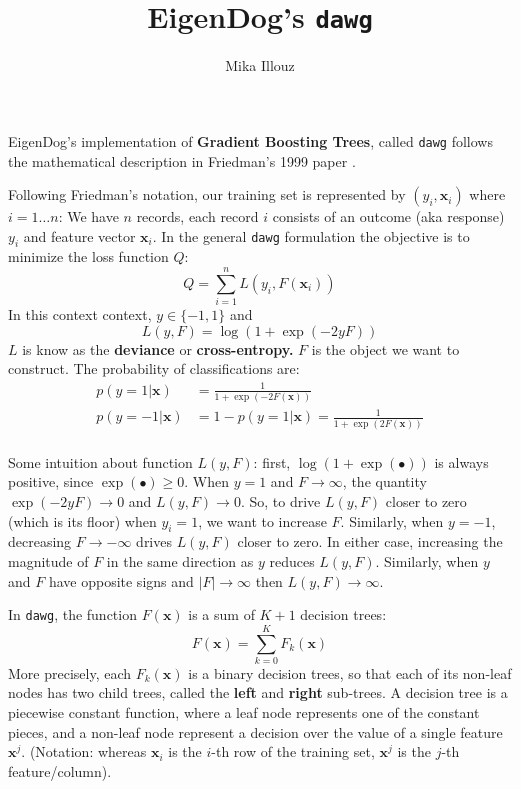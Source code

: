 \documentclass{article}
\author{Mika Illouz}
\title{EigenDog's \texttt{dawg}}
\newcommand{\vx}[0]{\mathbf{x}}
\begin{document}
\maketitle

EigenDog's implementation of {\bf Gradient Boosting Trees}, called
\texttt{dawg} follows the mathematical description in Friedman's 1999
paper \cite{GBM}.

Following Friedman's notation, our training set is represented by
$(y_i, \vx_i)$ where $i = 1 \ldots n$: We have $n$ records, each
record $i$ consists of an outcome (aka response) $y_i$ and feature
vector $\vx_i$.  In the general \texttt{dawg} formulation the objective is to
minimize the loss function $Q$:
%
\begin{equation}
\label{objective}
Q = \sum_{i=1}^{n} L(y_i, F(\vx_i))
\end{equation}
%
In this context context, $y \in \{ -1, 1 \}$ and
%
\[
L(y,F) = \log ( 1 + \exp( -2 y F ) )
\]
$L$ is know as the {\bf deviance} or {\bf cross-entropy.}  $F$ is the
object we want to construct.  The probability of classifications are:
\begin{equation}
\begin{split}
p(y =1|\vx) &= \frac{1}{1 + \exp(-2 F(\vx) )} \\
p(y =-1|\vx) &= 1 - p(y=1|\vx) = \frac{1}{1 + \exp(2 F(\vx) )} \\
\end{split}
\end{equation}

Some intuition about function $L(y,F)$:
first, $\log( 1 + \exp (\bullet) )$ is always positive, since
$\exp(\bullet) \ge 0$.  When $y=1$ and $F \rightarrow \infty$, the
quantity $\exp ( -2 y F ) \rightarrow 0$ and $L(y, F) \rightarrow 0$.
So, to drive $L(y, F)$ closer to zero (which is its floor) when
$y_i=1$, we want to increase $F$.  Similarly, when $y=-1$, decreasing
$F \rightarrow -\infty$ drives $L(y, F)$ closer to zero.  In either
case, increasing the magnitude of $F$ in the same direction as $y$
reduces $L(y,F)$.  Similarly, when $y$ and $F$ have opposite signs and
$| F | \rightarrow \infty$ then $L(y,F) \rightarrow \infty$.

In \texttt{dawg}, the function $F(\vx)$ is a sum of $K+1$ decision trees:
\[
F(\vx) = \sum_{k=0}^K F_k(\vx)
\]
More precisely, each $F_k(\vx)$ is a binary decision trees, so that
each of its non-leaf nodes has two child trees, called the {\bf left}
and {\bf right} sub-trees.  A decision tree is a piecewise constant
function, where a leaf node represents one of the constant pieces, and
a non-leaf node represent a decision over the value of a single
feature $\vx^j$.  (Notation: whereas $\vx_i$ is the $i$-th row of the
training set, $\vx^j$ is the $j$-th feature/column).
\end{document}
